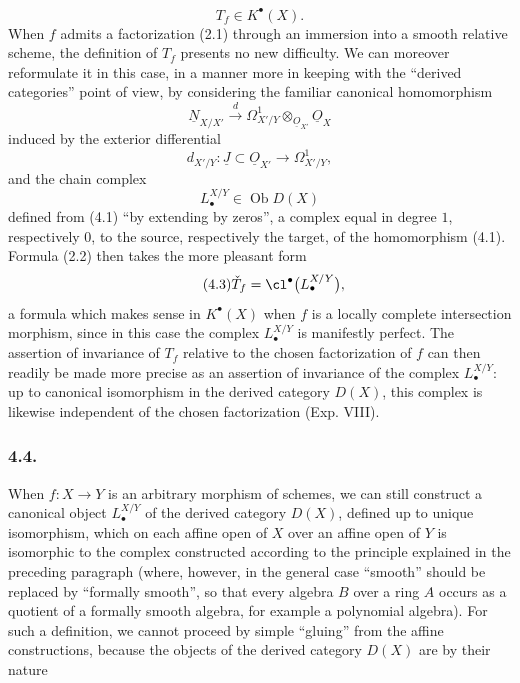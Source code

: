 \[
T_f\in K^\bullet(X).
\]
When $f$ admits a factorization (2.1) through an immersion into a smooth relative scheme, the definition of $T_f$ presents no new difficulty. We can moreover reformulate it in this case, in a manner more in keeping with the ``derived categories'' point of view, by considering the familiar canonical homomorphism
\begin{equation}\tag{4.1}
\underline N_{X/X'}\xrightarrow{d}\Omega^1_{X'/Y}\otimes_{\underline O_{X'}}\underline O_X
\end{equation}
induced by the exterior differential
\[
d_{X'/Y}:\underline J\subset\underline O_{X'}\longrightarrow\Omega^1_{X'/Y},
\]
and the chain complex
\begin{equation}\tag{4.2}
L^{X/Y}_\bullet\in\operatorname{Ob}D(X)
\end{equation}
defined from (4.1) ``by extending by zeros'', a complex equal in degree $1$, respectively $0$, to the source, respectively the target, of the homomorphism (4.1). Formula (2.2) then takes the more pleasant form
\begin{equation}\tag{4.3}
\check T_f=\cl^\bullet\bigl(L^{X/Y}_\bullet\bigr),
\end{equation}
a formula which makes sense in $K^\bullet(X)$ when $f$ is a locally complete intersection morphism, since in this case the complex $L^{X/Y}_\bullet$ is manifestly perfect. The assertion of invariance of $T_f$ relative to the chosen factorization of $f$ can then readily be made more precise as an assertion of invariance of the complex $L^{X/Y}_\bullet$: up to canonical isomorphism in the derived category $D(X)$, this complex is likewise independent of the chosen factorization (Exp. VIII).

\subsubsection*{4.4.}
When $f:X\to Y$ is an arbitrary morphism of schemes, we can still construct a canonical object $L^{X/Y}_\bullet$ of the derived category $D(X)$, defined up to unique isomorphism, which on each affine open of $X$ over an affine open of $Y$ is isomorphic to the complex constructed according to the principle explained in the preceding paragraph (where, however, in the general case ``smooth'' should be replaced by ``formally smooth'', so that every algebra $B$ over a ring $A$ occurs as a quotient of a formally smooth algebra, for example a polynomial algebra). For such a definition, we cannot proceed by simple ``gluing'' from the affine constructions, because the objects of the derived category $D(X)$ are by their nature

